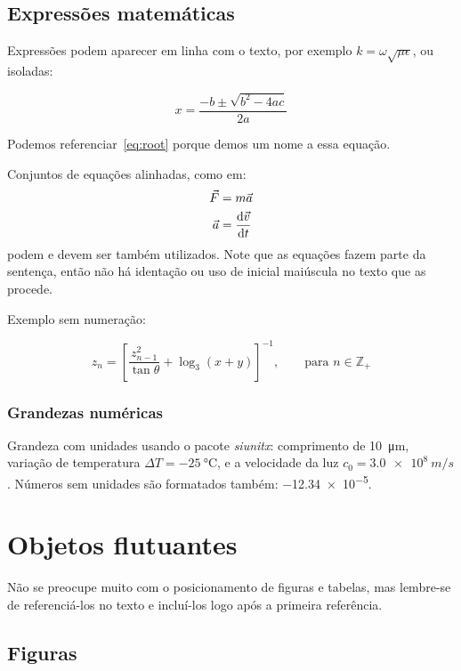 \subsection{Expressões matemáticas}
\label{ssec:math}

Expressões podem aparecer em linha com o texto, por exemplo $k = \omega \sqrt{\mu \epsilon}$, ou isoladas:

\begin{equation}
\label{eq:root}
x = \frac{-b \pm \sqrt{b^2 - 4ac}}{2a}
\end{equation}

Podemos referenciar~\eqref{eq:root} porque demos um nome a essa equação.

Conjuntos de equações alinhadas, como em:
%
\begin{align}
\vec{F} &= m \vec{a} \\
\vec{a} &= \frac{{\rm d}\vec{v}}{{\rm d}t}
\end{align}
%
podem e devem ser também utilizados.
Note que as equações fazem parte da sentença, então não há identação ou uso de inicial maiúscula no texto que as procede.

Exemplo sem numeração:

\begin{equation*}
z_n = \left[\frac{z_{n-1}^2}{\tan\theta} + \log_3(x + y)\right]^{-1},\qquad\text{para } n \in \mathbb{Z}_+
\end{equation*}


\subsubsection{Grandezas numéricas}

Grandeza com unidades usando o pacote \emph{siunitx}: comprimento de \SI{10}{\micro m}, variação de temperatura $\Delta T = \SI{-25}{\celsius}$, e a velocidade da luz $c_0 = \SI{3.0e8}{m/s}$.
Números sem unidades são formatados também: \num{-12.34e-5}.


\section{Objetos flutuantes}

Não se preocupe muito com o posicionamento de figuras e tabelas, mas lembre-se de referenciá-los no texto e incluí-los logo após a primeira referência.


\subsection{Figuras}

